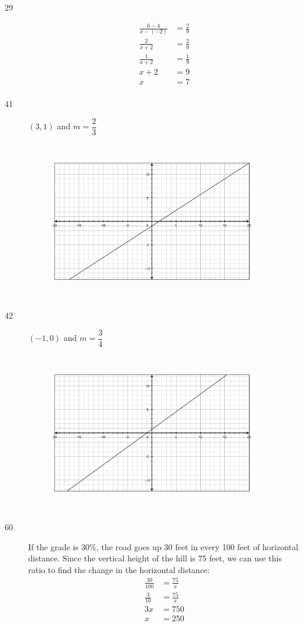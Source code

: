 \documentclass[fleqn,addpoints]{exam}
\begin{document}
\begin{description}
\item[29]
\begin{align*}
  \frac{6-4}{x - (-2)} &= \frac{2}{9} \\
  \frac{2}{x + 2} &= \frac{2}{9} \\
  \frac{1}{x + 2} &= \frac{1}{9} \\
  x+2 &= 9 \\
  x &= 7 \\
\end{align*}

\item[41]
$(3, 1)$ and $m = \dfrac{2}{3}$

\begin{figure}[H]
  \includegraphics[width=9cm,height=7cm]{p374/41}
\end{figure}


\item[42]
$(-1, 0)$ and $m = \dfrac{3}{4}$

\begin{figure}[H]
  \includegraphics[width=9cm,height=7cm]{p374/42}
\end{figure}

\item[60]
If the grade is 30\%, the road goes up 30 feet in every 100 feet of horizontal distance.  Since the vertical height of
the hill is 75 feet, we can use this ratio to find the change in the horizontal distance:
\begin{align*}
  \frac{30}{100} &= \frac{75}{x} \\
  \frac{3}{10} &= \frac{75}{x} \\
  3x &= 750 \\
  x &= 250 \\
\end{align*}


\end{description}
\end{document}
